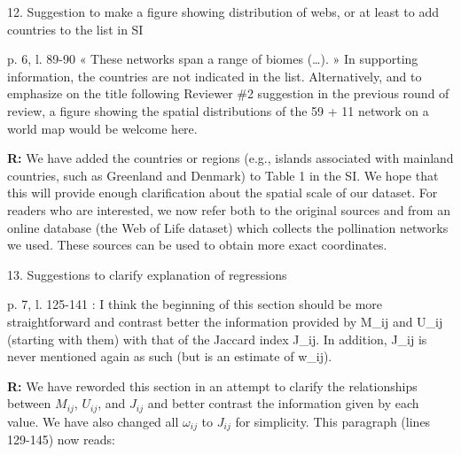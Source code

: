 \documentclass[12pt]{letter}
\newenvironment{refquote}{\bigskip \begin{it}}{\end{it}\smallskip}
\begin{document}
	12. Suggestion to make a figure showing distribution of webs, or at least to add countries to the list in SI


		\begin{refquote}
			p. 6, l. 89-90 « These networks span a range of biomes (…). » In supporting information, the countries are not indicated in the list. Alternatively, and to emphasize on the title following Reviewer \#2 suggestion in the previous round of review, a figure showing the spatial distributions of the 59 + 11 network on a world map would be welcome here.
		\end{refquote}


		\textbf{R:} We have added the countries or regions (e.g., islands associated with mainland countries, such as Greenland and Denmark) to Table 1 in the SI. We hope that this will provide enough clarification about the spatial scale of our dataset. For readers who are interested, we now refer both to the original sources and from an online database (the Web of Life dataset) which collects the pollination networks we used. These sources can be used to obtain more exact coordinates. 


	13. Suggestions to clarify explanation of regressions 

		\begin{refquote}
			p. 7, l. 125-141 : I think the beginning of this section should be more straightforward and contrast better the information provided by M\_ij and U\_ij (starting with them) with that of the Jaccard index J\_ij. In addition, J\_ij is never mentioned again as such (but is an estimate of w\_ij).
		\end{refquote}


		\textbf{R:} We have reworded this section in an attempt to clarify the relationships between $M_{ij}$, $U_{ij}$, and $J_{ij}$ and better contrast the information given by each value. We have also changed all $\omega_{ij}$ to $J_{ij}$ for simplicity. This paragraph (lines 129-145) now reads:
\end{document}

